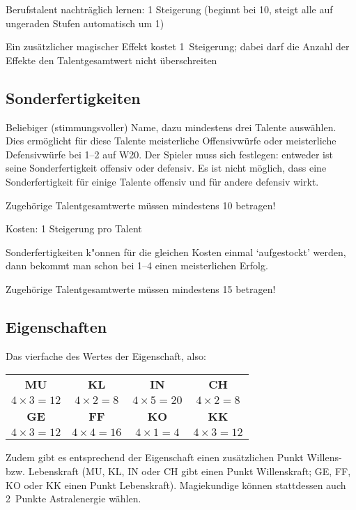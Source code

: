 Berufstalent nachträglich lernen: 1 Steigerung (beginnt bei 10, steigt alle auf ungeraden Stufen automatisch um 1)

Ein zusätzlicher magischer Effekt kostet 1~Steigerung; dabei darf die Anzahl der Effekte den Talentgesamtwert nicht überschreiten


\subsection{Sonderfertigkeiten}
Beliebiger (stimmungsvoller) Name, dazu mindestens drei Talente auswählen. Dies ermöglicht für diese Talente meisterliche Offensivwürfe oder meisterliche Defensivwürfe bei 1--2 auf W20. Der Spieler muss sich festlegen: entweder ist seine Sonderfertigkeit offensiv oder defensiv. Es ist nicht möglich, dass eine Sonderfertigkeit für einige Talente offensiv und für andere defensiv wirkt.

Zugehörige Talentgesamtwerte müssen mindestens 10 betragen!

Kosten: 1 Steigerung pro Talent

Sonderfertigkeiten k"onnen für die gleichen Kosten einmal `aufgestockt' werden, dann bekommt man schon bei 1--4 einen meisterlichen Erfolg.

Zugehörige Talentgesamtwerte müssen mindestens 15 betragen!

\subsection{Eigenschaften}
Das vierfache des Wertes der Eigenschaft, also:
\begin{tabular}[C]{cccc}
  \bf MU & \bf KL & \bf IN & \bf CH \\
  $4\times3=12$ & $4\times2=8$ & $4\times5=20$ & $4\times2=8$ \\[\medskipamount]
  \bf GE & \bf FF & \bf KO & \bf KK \\
  $4\times3=12$ & $4\times4=16$ & $4\times1=4$ & $4\times3=12$ \\
\end{tabular}

Zudem gibt es entsprechend der Eigenschaft einen zusätzlichen Punkt Willens- bzw. Lebenskraft (MU, KL, IN oder CH gibt einen Punkt Willenskraft; GE, FF, KO oder KK einen Punkt Lebenskraft). Magiekundige können stattdessen auch 2~Punkte Astralenergie wählen.


